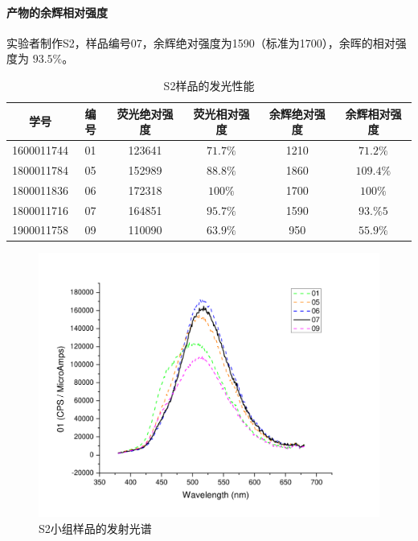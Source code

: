 \documentclass[a4paper,zihao=5,UTF8]{ctexart}
\begin{document}
	\paragraph{产物的余辉相对强度}
	实验者制作S2，样品编号07，余辉绝对强度为1590（标准为1700），余晖的相对强度为
	$93.5\%$。
	\begin{table}[htbp]
	\caption{S2样品的发光性能}%
	\centering%
	\begin{tabular}{cccccc}%
	\toprule%
	学号 & 编号 & 荧光绝对强度 & 荧光相对强度 & 余辉绝对强度 & 余辉相对强度 \\
	\midrule%
	1600011744 & 01 & 123641 & $71.7\%$ & 1210 & $71.2\%$ \\
	1800011784 & 05	& 152989 & $88.8\%$ & 1860 & $109.4\%$ \\
	1800011836 & 06 & 172318 & $100\%$ & 1700 & $100\%$ \\
	1800011716 & 07 & 164851 & $95.7\%$ & 1590 & $93.\%5$ \\
	1900011758 & 09 & 110090 & $63.9\%$	& 950 & $55.9\%$ \\
	\bottomrule%
	\end{tabular}
	\label{table of fluorescence}
	\end{table}
	\begin{figure}[htbp]
		\centering
		\includegraphics[scale=0.50]{S2fluorescence.pdf}
		\caption{S2小组样品的发射光谱}
		\label{S2 fluorescence spectrum}
	\end{figure}
\end{document}
